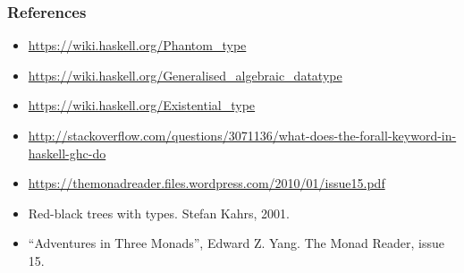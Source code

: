 \documentclass[aspectratio=43]{beamer}
\begin{document}
\begin{frame}[fragile]
 \frametitle{References}
 \begin{itemize}
  \item \url{https://wiki.haskell.org/Phantom_type}
  \item \url{https://wiki.haskell.org/Generalised_algebraic_datatype}
  \item \url{https://wiki.haskell.org/Existential_type}
  \item \url{http://stackoverflow.com/questions/3071136/what-does-the-forall-keyword-in-haskell-ghc-do}
  \item \url{https://themonadreader.files.wordpress.com/2010/01/issue15.pdf}
  \item Red-black trees with types. Stefan Kahrs, 2001.
  \item ``Adventures in Three Monads'', Edward Z. Yang. The Monad Reader, issue 15.
 \end{itemize}
\end{frame}
\end{document}
